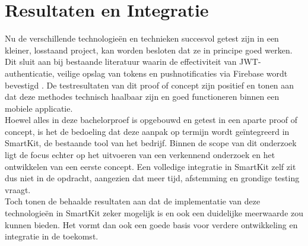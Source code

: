 \section{Resultaten en Integratie}

Nu de verschillende technologieën en technieken succesvol getest zijn in een kleiner, losstaand project, kan worden besloten dat ze in principe goed werken. Dit sluit aan bij bestaande literatuur waarin de effectiviteit van JWT-authenticatie, veilige opslag van tokens en pushnotificaties via Firebase wordt bevestigd \autocite{Gao2023, Wohllebe2021}. De testresultaten van dit proof of concept zijn positief en tonen aan dat deze methodes technisch haalbaar zijn en goed functioneren binnen een mobiele applicatie.\\

Hoewel alles in deze bachelorproef is opgebouwd en getest in een aparte proof of concept, is het de bedoeling dat deze aanpak op termijn wordt geïntegreerd in SmartKit, de bestaande tool van het bedrijf. Binnen de scope van dit onderzoek ligt de focus echter op het uitvoeren van een verkennend onderzoek en het ontwikkelen van een eerste concept. Een volledige integratie in SmartKit zelf zit dus niet in de opdracht, aangezien dat meer tijd, afstemming en grondige testing vraagt.\\

Toch tonen de behaalde resultaten aan dat de implementatie van deze technologieën in SmartKit zeker mogelijk is en ook een duidelijke meerwaarde zou kunnen bieden. Het vormt dan ook een goede basis voor verdere ontwikkeling en integratie in de toekomst.
